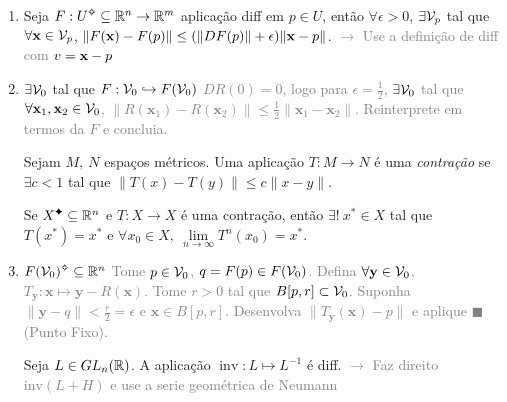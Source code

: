 \begin{enumerate}[left = 0cm]
\begin{tikzpicture}[scale=1.2, >=to, shift={(11.4cm,2.1cm)}, baseline={(current bounding box.center)}, remember picture, overlay]
\end{tikzpicture}
\- \vspace{-2.2cm}
\item[] \begin{lemma}
    Seja \(F:U\ab\subseteq \R^n \to \R^m\) aplicação diff em \(p\in U\), então \(\forall \epsilon >0\), \( \exists \V_p \) tal que \(\forall\textbf{x} \in \V_p\), \(\|F(\textbf{x})- F(p)\| \leq (\|DF(p)\|+\epsilon )\|\x - p\|\). \textcolor{gray}{\(\rightarrow \) Use a definição de diff com \(v= \x-p\)} 
\end{lemma}
\item[] \begin{tcolorbox}[colframe=gray, colback=white, boxrule = 0.8pt]
    \centering \(\exists \V_0\) tal que \(F: \V_0 \hookrightarrow F(\V_0)\)  
    \tcblower 
    \textcolor{gray}{\(DR(0)=0\), logo para \(\epsilon = \frac{1}{2}\), \(\exists\V_0\) tal que \(\forall \textbf{x}_1, \textbf{x}_2 \in \V_0\), \(\|R(\textbf{x}_1) - R(\textbf{x}_2)\|\leq \frac{1}{2}\|\textbf{x}_1-\textbf{x}_2\|\). Reinterprete em termos da \(F\) e concluia.}  
\end{tcolorbox}
\begin{definition}
    Sejam \(M, \ N\) espaços métricos. Uma aplicação \(T:M\to N\) é uma \emph{contração} se \(\exists c<1\) tal que \(\|T(x)- T(y)\|\leq c\|x-y\|\). 
\end{definition}
\begin{theorem}
    Se \(X\ce\subseteq \R^n\) e \(T:X\to X\) é uma contração, então \(\exists! \ x^*\in X \) tal que \(T(x^*)= x^*\) e \(\forall x_0 \in X, \ \lim\limits_{n\to \infty} T^n(x_0) = x^*\).   
\end{theorem}
\item[] \begin{tcolorbox}[colframe=gray, colback=white, boxrule = 0.8pt]
    \centering \(F(\V_0)\ab \subseteq \R^n\) 
    \tcblower 
    \textcolor{gray}{Tome \(p \in \V_0\), \(q = F(p) \in F(\V_0)\). Defina \(\forall \textbf{y} \in \V_0 \), \(T_{\textbf{y}}: \textbf{x} \mapsto  \textbf{y} - R(\textbf{x})\). Tome \(r>0\) tal que \(B[p,r] \subset \V_0\). Suponha \(\|\textbf{y}- q\|<\frac{r}{2} = \epsilon\) e \(\textbf{x} \in B[p,r]\). Desenvolva \(\|T_{\textbf{y}}(\textbf{x}) - p\|\) e aplique \(\blacksquare\) (Punto Fixo). }%
\end{tcolorbox}
\begin{lemma}
    Seja \(L \in GL_n(\R)\). A aplicação \(\operatorname{inv}: L \mapsto L^{-1} \) é diff. \textcolor{gray}{\(\rightarrow \) Faz direito \(\text{inv}(L+H)\) e use a serie geométrica de Neumann}    

\end{lemma}
\end{enumerate}
